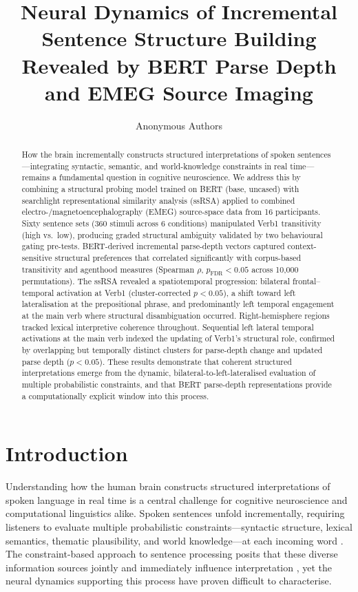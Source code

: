 \documentclass[11pt]{article}
\title{Neural Dynamics of Incremental Sentence Structure Building Revealed by BERT Parse Depth and EMEG Source Imaging}
\author{Anonymous Authors}
\date{}
\begin{document}
\maketitle

\begin{abstract}
How the brain incrementally constructs structured interpretations of spoken sentences---integrating syntactic, semantic, and world-knowledge constraints in real time---remains a fundamental question in cognitive neuroscience. We address this by combining a structural probing model trained on BERT (base, uncased) with searchlight representational similarity analysis (ssRSA) applied to combined electro-/magnetoencephalography (EMEG) source-space data from 16 participants. Sixty sentence sets (360 stimuli across 6 conditions) manipulated Verb1 transitivity (high vs.\ low), producing graded structural ambiguity validated by two behavioural gating pre-tests. BERT-derived incremental parse-depth vectors captured context-sensitive structural preferences that correlated significantly with corpus-based transitivity and agenthood measures (Spearman $\rho$, $p_{\mathrm{FDR}} < 0.05$ across 10,000 permutations). The ssRSA revealed a spatiotemporal progression: bilateral frontal--temporal activation at Verb1 (cluster-corrected $p < 0.05$), a shift toward left lateralisation at the prepositional phrase, and predominantly left temporal engagement at the main verb where structural disambiguation occurred. Right-hemisphere regions tracked lexical interpretive coherence throughout. Sequential left lateral temporal activations at the main verb indexed the updating of Verb1's structural role, confirmed by overlapping but temporally distinct clusters for parse-depth change and updated parse depth ($p < 0.05$). These results demonstrate that coherent structured interpretations emerge from the dynamic, bilateral-to-left-lateralised evaluation of multiple probabilistic constraints, and that BERT parse-depth representations provide a computationally explicit window into this process.
\end{abstract}

\section{Introduction}

Understanding how the human brain constructs structured interpretations of spoken language in real time is a central challenge for cognitive neuroscience and computational linguistics alike. Spoken sentences unfold incrementally, requiring listeners to evaluate multiple probabilistic constraints---syntactic structure, lexical semantics, thematic plausibility, and world knowledge---at each incoming word \citep{marslenWilson1978sequential, tanenhaus1995integration}. The constraint-based approach to sentence processing posits that these diverse information sources jointly and immediately influence interpretation \citep{macdonald1994lexical, trueswell1996role}, yet the neural dynamics supporting this process have proven difficult to characterise.
\end{document}
